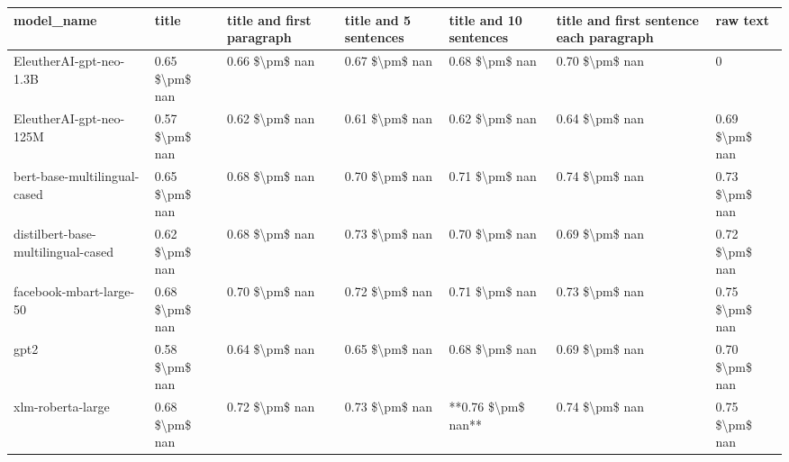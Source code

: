 \begin{tabular}{lllllll}
\toprule
                        model\_name &          title & title and first paragraph & title and 5 sentences & title and 10 sentences & title and first sentence each paragraph &       raw text \\
\midrule
           EleutherAI-gpt-neo-1.3B & 0.65 \$\textbackslash pm\$ nan &            0.66 \$\textbackslash pm\$ nan &        0.67 \$\textbackslash pm\$ nan &         0.68 \$\textbackslash pm\$ nan &                          0.70 \$\textbackslash pm\$ nan &              0 \\
           EleutherAI-gpt-neo-125M & 0.57 \$\textbackslash pm\$ nan &            0.62 \$\textbackslash pm\$ nan &        0.61 \$\textbackslash pm\$ nan &         0.62 \$\textbackslash pm\$ nan &                          0.64 \$\textbackslash pm\$ nan & 0.69 \$\textbackslash pm\$ nan \\
      bert-base-multilingual-cased & 0.65 \$\textbackslash pm\$ nan &            0.68 \$\textbackslash pm\$ nan &        0.70 \$\textbackslash pm\$ nan &         0.71 \$\textbackslash pm\$ nan &                          0.74 \$\textbackslash pm\$ nan & 0.73 \$\textbackslash pm\$ nan \\
distilbert-base-multilingual-cased & 0.62 \$\textbackslash pm\$ nan &            0.68 \$\textbackslash pm\$ nan &        0.73 \$\textbackslash pm\$ nan &         0.70 \$\textbackslash pm\$ nan &                          0.69 \$\textbackslash pm\$ nan & 0.72 \$\textbackslash pm\$ nan \\
           facebook-mbart-large-50 & 0.68 \$\textbackslash pm\$ nan &            0.70 \$\textbackslash pm\$ nan &        0.72 \$\textbackslash pm\$ nan &         0.71 \$\textbackslash pm\$ nan &                          0.73 \$\textbackslash pm\$ nan & 0.75 \$\textbackslash pm\$ nan \\
                              gpt2 & 0.58 \$\textbackslash pm\$ nan &            0.64 \$\textbackslash pm\$ nan &        0.65 \$\textbackslash pm\$ nan &         0.68 \$\textbackslash pm\$ nan &                          0.69 \$\textbackslash pm\$ nan & 0.70 \$\textbackslash pm\$ nan \\
                 xlm-roberta-large & 0.68 \$\textbackslash pm\$ nan &            0.72 \$\textbackslash pm\$ nan &        0.73 \$\textbackslash pm\$ nan &     **0.76 \$\textbackslash pm\$ nan** &                          0.74 \$\textbackslash pm\$ nan & 0.75 \$\textbackslash pm\$ nan \\
\bottomrule
\end{tabular}
